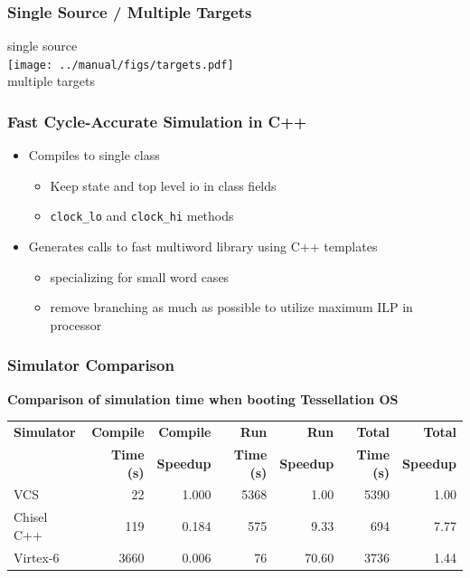 \documentclass[xcolor=pdflatex,dvipsnames,table]{beamer}
\begin{document}
\begin{frame}[fragile]
\frametitle{Single Source / Multiple Targets}

\begin{center}
single source \\
\texttt{[image: ../manual/figs/targets.pdf]} \\
multiple targets \
\end{center}

\end{frame}


\begin{frame}[fragile]
\frametitle{Fast Cycle-Accurate Simulation in C++}

\begin{itemize}
\item Compiles to single class 
\begin{itemize}
\item Keep state and top level io in class fields
\item \verb+clock_lo+ and \verb+clock_hi+ methods
\end{itemize}
\item Generates calls to fast multiword library using C++ templates 
\begin{itemize}
\item specializing for small word cases
\item remove branching as much as possible to utilize maximum ILP in processor
\end{itemize}
\end{itemize}

\end{frame}

\begin{frame}[fragile]
\frametitle{Simulator Comparison}

\textbf{Comparison of simulation time when booting Tessellation OS}
\vskip0.5cm

\begin{footnotesize}
\begin{tabular}{lrrrrrr}
\textbf{Simulator} & \textbf{Compile}  & \textbf{Compile} & \textbf{Run}  & \textbf{Run} & \textbf{Total} & \textbf{Total} \\
& \textbf{Time (s)}  & \textbf{Speedup} & \textbf{Time (s)}  & \textbf{Speedup} & \textbf{Time (s)} & \textbf{Speedup} \\
\hline
VCS             &   22 & 1.000 & 5368 & 1.00 & 5390 & 1.00 \\ 
Chisel C++  & 119 & 0.184 & 575 & 9.33 & 694 & 7.77\\
Virtex-6 & 3660 & 0.006 & 76 & 70.60 & 3736 & 1.44\\
\end{tabular}
\end{footnotesize}


\end{frame}
\end{document}
